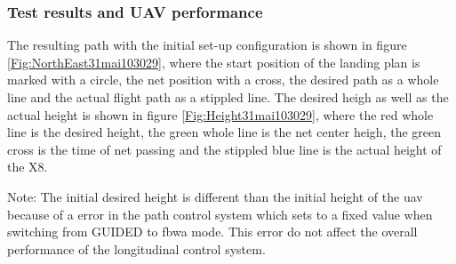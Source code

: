\subsubsection{Test results and UAV performance}
The resulting path with the initial set-up configuration is shown in figure \ref{Fig:NorthEast31mai103029}, where the start position of the landing plan is marked with a circle, the net position with a cross, the desired path as a whole line and the actual flight path as a stippled line. The desired heigh as well as the actual height is shown in figure \ref{Fig:Height31mai103029}, where the red whole line is the desired height, the green whole line is the net center heigh, the green cross is the time of net passing and the stippled blue line is the actual height of the X8.

Note: The initial desired height is different than the initial height of the \gls{uav} because of a error in the path control system which sets to a fixed  value when switching from GUIDED to \gls{fbwa} mode. This error do not affect the overall performance of the longitudinal control system.


